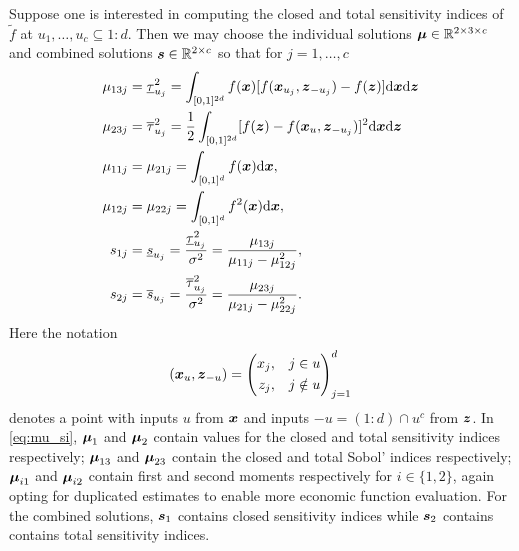 \documentclass{article}[12pt]
\begin{document}
Suppose one is interested in computing the closed and total sensitivity indices of $\tilde{f}$ at $u_1,\dots,u_c \subseteq 1:d$.  Then we may choose the individual solutions $\boldsymbol{\mu} \in \mathbb{R}^{2 \times 3 \times c}$ and combined solutions $\boldsymbol{s} \in \mathbb{R}^{2 \times c}$ so that for $j=1,\dots,c$
\begin{equation}
\begin{aligned}
    \mu_{13j} &= \underline{\tau}_{u_j}^2 = \int_{[0,1]^{2d}} f(\boldsymbol{x})[f(\boldsymbol{x}_{u_j},\boldsymbol{z}_{-{u_j}})-f(\boldsymbol{z})]\mathrm{d}\boldsymbol{x}\mathrm{d}\boldsymbol{z} \\
    \mu_{23j} &= \overline{\tau}_{u_j}^2 = \frac{1}{2}\int_{[0,1]^{2d}} [f(\boldsymbol{z})-f(\boldsymbol{x}_u,\boldsymbol{z}_{-{u_j}})]^2\mathrm{d}\boldsymbol{x}\mathrm{d}\boldsymbol{z} \\
    \mu_{11j} &= \mu_{21j} = \int_{[0,1]^{d}} f(\boldsymbol{x})\mathrm{d}\boldsymbol{x}, \\
    \mu_{12j} &= \mu_{22j} = \int_{[0,1]^{d}} f^2(\boldsymbol{x})\mathrm{d}\boldsymbol{x}, \\
    s_{1j} &= \underline{s}_{u_j} = \frac{\underline{\tau}_{u_j}^2}{\sigma^2} = \frac{\mu_{13j}}{\mu_{11j}-\mu_{12j}^2}, \\
    s_{2j} &= \overline{s}_{u_j} = \frac{\overline{\tau}_{u_j}^2}{\sigma^2} = \frac{\mu_{23j}}{\mu_{21j}-\mu_{22j}^2}.  
\end{aligned}
\label{eq:mu_si}
\end{equation}
Here the notation
\begin{equation*}
    (\boldsymbol{x}_{u},\boldsymbol{z}_{-u}) = \left(\begin{aligned}x_{j}, \quad & j \in u \\ z_{j}, \quad & j \notin u \end{aligned}\right)_{j=1}^{d}
\end{equation*}
denotes a point with inputs $u$ from $\boldsymbol{x}$ and inputs $-u=(1:d)\cap u^c$ from $\boldsymbol{z}$. In \eqref{eq:mu_si}, $\boldsymbol{\mu}_1$ and $\boldsymbol{\mu}_2$ contain values for the closed and  total sensitivity indices respectively; $\boldsymbol{\mu}_{13}$ and $\boldsymbol{\mu}_{23}$ contain the closed and total Sobol' indices respectively; $\boldsymbol{\mu}_{i1}$ and $\boldsymbol{\mu}_{i2}$ contain first and second moments respectively for $i \in \{1,2\}$, again opting for duplicated estimates to enable more economic function evaluation. For the combined solutions, $\boldsymbol{s}_1$ contains closed sensitivity indices while $\boldsymbol{s}_2$ contains contains total sensitivity indices. 
\end{document}
